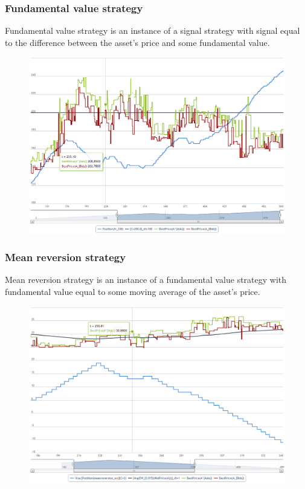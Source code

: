 \documentclass{beamer}
\begin{document}
\begin{frame}
\frametitle{Fundamental value strategy}
Fundamental value strategy is an instance of a signal strategy with signal equal to the difference between the asset's price and some fundamental value.
\begin{figure}[htbp]
\centering
\includegraphics[width=1\linewidth]{fundamentalvalue.png}
\end{figure}
\end{frame}

\begin{frame}
\frametitle{Mean reversion strategy}
Mean reversion strategy is an instance of a fundamental value strategy with fundamental value equal to some moving average of the asset's price.
\begin{figure}[htbp]
\centering
\includegraphics[width=1\linewidth]{meanreversion.png}
\end{figure}
\end{frame}
\end{document}

